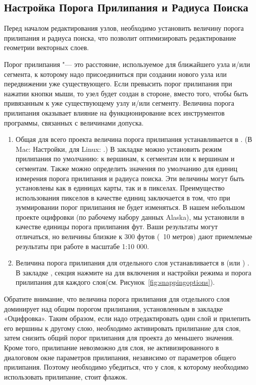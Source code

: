 \subsection{Настройка Порога Прилипания и Радиуса Поиска}\label{snapping_tolerance}

Перед началом редактирования узлов, необходимо установить величину порога
прилипания и радиуса поиска, что позволит оптимизировать редактирование
геометрии векторных слоев.


Порог прилипания "--- это расстояние, используемое \qg для 
ближайшего узла и/или сегмента, к которому надо присоединиться при создании
нового узла или передвижении уже существующего. Если превысить порог
прилипания \qg при нажатии кнопки мыши, то узел будет создан  в стороне,
вместо того, чтобы быть привязанным к уже существующему узлу и/или сегменту.
Величина порога прилипания оказывает влияние на функционирование всех
инструментов программы, связанных с величинами допуска.

\begin{enumerate}
\item Общая для всего проекта величина порога прилипания устанавливается в
 \arrow {}.
(В Mac: \mainmenuopt{\qg} \arrow Настройки, для Linux: 
\arrow {}.)
В закладке  можно установить режим прилипания по умолчанию: к
вершинам, к сегментам или к вершинам и сегментам. Также можно определить
значения по умолчанию для единиц измерения порога прилипания и радиуса поиска.
Эти величины  могут быть установлены как в единицах карты, так и в пикселах.
Преимущество использования пикселов в качестве единиц заключается в том, что
при зуммировании порог прилипания не будет изменяться.
В нашем небольшом проекте оцифровки (по рабочему набору данных Alaska), мы
установили в качестве единицы порога прилипания фут. Ваши результаты могут
отличаться, но величины близкие к 300 футов (~10 метров) дают приемлемые
результаты при работе в масштабе 1:10 000.
\item Величина порога прилипания для отдельного слоя устанавливается в
 (или ) \arrow
{}. В закладке ,
секция  нажмите на  для
включения и настройки режима и порога прилипания для каждого слоя(см.
Рисунок~\ref{fig:snappingoptions}).
\end{enumerate}
Обратите внимание, что величина порога прилипания для отдельного слоя
доминирует над общим порогом прилипания, установленным в закладке «Оцифровка».
Таким образом, если надо отредактировать один слой и прилепить его вершины
к другому слою, необходимо активировать прилипание 
для слоя, затем снизить общий порог прилипания для проекта до меньшего
значения. Кроме того, прилипание невозможно для слоя, не активизированного
в диалоговом окне параметров прилипания, независимо от параметров
общего прилипания. Поэтому необходимо убедиться, что у слоя, к которому
необходимо использовать прилипание, стоит флажок.

